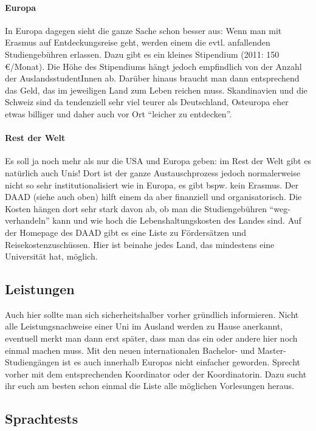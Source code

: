 \paragraph{Europa} In Europa dagegen sieht die ganze Sache schon besser aus: Wenn man mit Erasmus auf Entdeckungsreise geht, werden einem die evtl. anfallenden Studiengebühren erlassen. Dazu gibt es ein kleines Stipendium (2011: 150 \euro{}/Monat). Die Höhe des Stipendiums hängt jedoch empfindlich von der Anzahl der AuslandsstudentInnen ab. Darüber hinaus braucht man dann entsprechend das Geld, das im jeweiligen Land zum Leben reichen muss. Skandinavien und die Schweiz sind da tendenziell sehr viel teurer als Deutschland, Osteuropa eher etwas billiger und daher auch vor Ort \enquote{leicher zu entdecken}.

\paragraph{Rest der Welt} Es soll ja noch mehr als nur die USA und Europa geben: im Rest der Welt gibt es natürlich auch Unis! Dort ist der ganze Austauschprozess jedoch normalerweise nicht so sehr institutionalisiert wie in Europa, es gibt bspw. kein Erasmus. Der DAAD (siehe auch oben) hilft einem da aber finanziell und organisatorisch. Die Kosten hängen dort sehr stark davon ab, ob man die Studiengebühren \enquote{weg-verhandeln} kann und wie hoch die Lebenshaltungskosten des Landes sind. Auf der Homepage des DAAD gibt es eine Liste zu Fördersätzen und Reisekostenzuschüssen. Hier ist beinahe jedes Land, das mindestens eine Universität hat, möglich.

\subsection{Leistungen}
Auch hier sollte man sich sicherheitshalber vorher gründlich informieren. Nicht alle Leistungsnachweise einer Uni im Ausland werden zu Hause anerkannt, eventuell merkt man dann erst später, dass man das ein oder andere hier noch einmal machen muss. Mit den neuen internationalen Bachelor- und Master-Studiengängen ist es auch innerhalb Europas nicht einfacher geworden. Sprecht vorher mit dem entsprechenden Koordinator oder der Koordinatorin. Dazu sucht ihr euch am besten schon einmal die Liste alle möglichen Vorlesungen heraus.

\subsection{Sprachtests}
